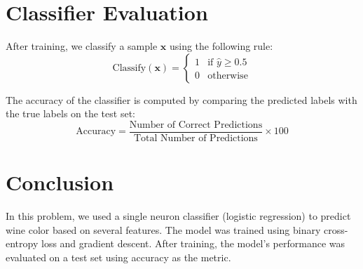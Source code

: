 \documentclass{article}
\begin{document}
\section{Classifier Evaluation}

After training, we classify a sample $\mathbf{x}$ using the following rule:
\[
\text{Classify}(\mathbf{x}) =
\begin{cases}
1 & \text{if } \hat{y} \geq 0.5 \\
0 & \text{otherwise}
\end{cases}
\]

The accuracy of the classifier is computed by comparing the predicted labels with the true labels on the test set:
\[
\text{Accuracy} = \frac{\text{Number of Correct Predictions}}{\text{Total Number of Predictions}} \times 100
\]

\section{Conclusion}

In this problem, we used a single neuron classifier (logistic regression) to predict wine color based on several features. The model was trained using binary cross-entropy loss and gradient descent. After training, the model's performance was evaluated on a test set using accuracy as the metric.
\end{document}
